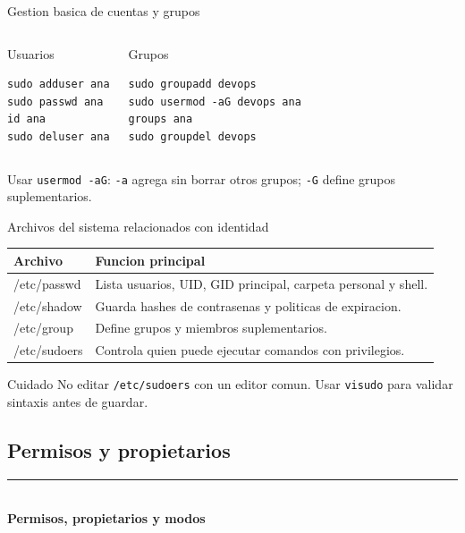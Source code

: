 \documentclass[aspectratio=169]{beamer}
\newcommand{\MainHeaderSlide}[2]{%
  \begin{frame}[plain]
    \hypertarget{#2}{}
    \vspace*{0.25\textheight}
    {\color{black}\rule{0.28\textwidth}{1.2pt}}\\[0.5em]
    {\usebeamerfont{title}\fontsize{34}{40}\selectfont\bfseries #1}
  \end{frame}
}
\begin{document}
\begin{frame}[fragile]{Gestion basica de cuentas y grupos}
  \small
  \begin{columns}[t]
    \begin{block}{Usuarios}
\begin{verbatim}
sudo adduser ana
sudo passwd ana
id ana
sudo deluser ana
\end{verbatim}
    \end{block}
    \begin{block}{Grupos}
\begin{verbatim}
sudo groupadd devops
sudo usermod -aG devops ana
groups ana
sudo groupdel devops
\end{verbatim}
    \end{block}
  \end{columns}
  \vfill
  \small Usar \texttt{usermod -aG}: \texttt{-a} agrega sin borrar otros grupos; \texttt{-G} define grupos suplementarios.
\end{frame}

\begin{frame}{Archivos del sistema relacionados con identidad}
  \footnotesize
  \begin{center}
  \begin{tabular}{>{\ttfamily}p{} p{}}
    \toprule
    \normalfont Archivo & Funcion principal \\
    \midrule
    /etc/passwd & Lista usuarios, UID, GID principal, carpeta personal y shell. \\
    /etc/shadow & Guarda hashes de contrasenas y politicas de expiracion. \\
    /etc/group & Define grupos y miembros suplementarios. \\
    /etc/sudoers & Controla quien puede ejecutar comandos con privilegios. \\
    \bottomrule
  \end{tabular}
  \end{center}
  \vspace{0.25cm}
  \begin{alertblock}{Cuidado}
    \small No editar \texttt{/etc/sudoers} con un editor comun. Usar \texttt{visudo} para validar sintaxis antes de guardar.
  \end{alertblock}
\end{frame}

\subsection{Permisos y propietarios}
\MainHeaderSlide{Permisos, propietarios y modos}{idx-permisos-linux}
\end{document}
